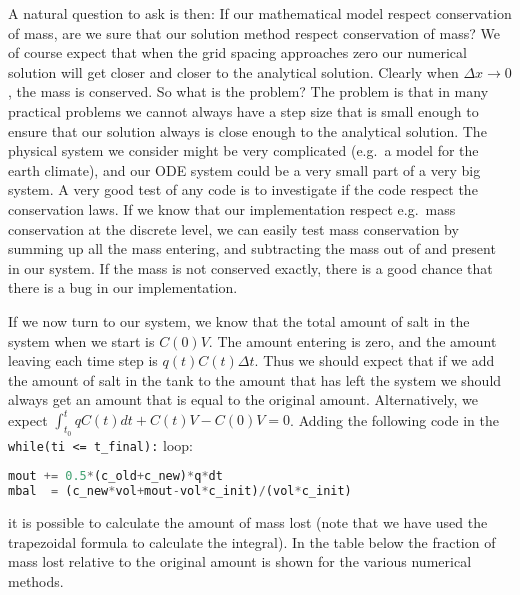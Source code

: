 \documentclass[graybox,sectrefs,envcountresetchap,open=right,final]{svmonodo}
\begin{document}
A natural question to ask is then: If our mathematical model respect conservation of mass, are we sure that our 
solution method respect conservation of mass? We of course expect that
when the grid spacing approaches zero our numerical solution will get closer and closer to the analytical
solution. Clearly when $\Delta x\to 0$, the mass is conserved. So what is the problem? The problem is that in many practical problems
we cannot always have a step size that is small enough to ensure that our solution always is close enough to the analytical 
solution. The physical system we consider might be very complicated (e.g.~a model for the earth climate), and our ODE system could
be a very small part of a very big system. A very good test of any code is to investigate if the code respect
the conservation laws. If we know that our implementation respect e.g.~mass conservation at the discrete level, we can easily
test mass conservation by summing up all the mass entering, and subtracting the mass out of and present in our system.
If the mass is not conserved exactly, there is a good chance that there is a bug in our implementation.

If we now turn to our system, we know that the total amount of salt in the system when we start is $C(0)V$.
The amount entering is zero, and the amount leaving each time step is $q(t)C(t)\Delta t$. Thus we should
expect that if we add the amount of salt in the tank to the amount that has left the system
we should always get an amount that is equal to the original amount. Alternatively, we expect
$\int_{t_0}^t qC(t)dt + C(t)V -C(0)V=0$. Adding the following code in the \Verb!while(ti <= t_final):! loop:



\begin{lstlisting}[language=python,style=blue1]
mout += 0.5*(c_old+c_new)*q*dt
mbal  = (c_new*vol+mout-vol*c_init)/(vol*c_init)

\end{lstlisting}

it is possible to calculate the amount of mass lost (note that we have used the
trapezoidal formula to calculate the integral). In the table below the fraction of mass lost relative to the original
amount is shown for the various numerical methods.
\end{document}
